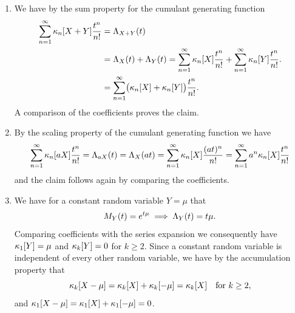\documentclass[11pt]{article}
\begin{document}
\begin{solution}
\begin{enumerate}[wide=0pt]
    \item[\ref{it: (cumulants) accumulate}]
    We have by the sum property for the cumulant generating function
    \begin{align*}
        \sum_{n=1}^\infty \kappa_n[X+Y] \frac{t^n}{n!}
        &= \Lambda_{X+Y}(t)
        \\
        &= \Lambda_X(t) + \Lambda_Y(t)
        = \sum_{n=1}^\infty \kappa_n[X] \frac{t^n}{n!} + \sum_{n=1}^\infty \kappa_n[Y] \frac{t^n}{n!}.
        \\
        &= \sum_{n=1}^\infty \bigl(\kappa_n[X] + \kappa_n[Y]\bigr) \frac{t^n}{n!}.
    \end{align*}
    A comparison of the coefficients proves the claim.

    \item[\ref{it: (cumulants) homogeneity}]
    By the scaling property of the cumulant generating function we have
    \[
        \sum_{n=1}^\infty \kappa_n[aX] \frac{t^n}{n!}
        = \Lambda_{aX}(t)
        = \Lambda_X(at)
        = \sum_{n=1}^\infty \kappa_n[X] \frac{(at)^n}{n!}
        = \sum_{n=1}^\infty a^n \kappa_n[X] \frac{t^n}{n!}
    \]
    and the claim follows again by comparing the coefficients.

    \item[\ref{it: (cumulants) constant}] We have
    for a constant random variable \(Y=\mu\) that
    \[
        M_Y(t) = e^{t \mu} \implies \Lambda_Y(t) = t \mu.
    \]
    Comparing coefficients with the series expansion we consequently have
    \(\kappa_1[Y] = \mu\) and \(\kappa_k[Y] = 0\) for \(k \ge 2\).
    Since a constant random variable is independent of every other random variable,
    we have by the accumulation property that
    \[
        \kappa_k[X-\mu]
        = \kappa_k[X] + \kappa_k[-\mu]
        = \kappa_k[X]
        \quad\text{for } k \ge 2,
    \]
    and \(\kappa_1[X-\mu] = \kappa_1[X] + \kappa_1[-\mu] = 0\).
    \qedhere
    \end{enumerate}
\end{solution}
\end{document}
